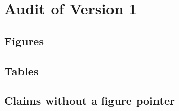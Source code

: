 \section{Audit of Version 1}\label{sec:audit}


\subsection{Figures}\label{sec:audit-figures}

\subsection{Tables}\label{sec:audit-tables}

\subsection{Claims without a figure pointer}\label{sec:audit-claims}
